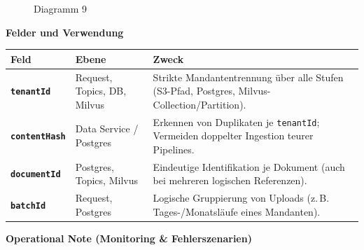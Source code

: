 \begin{figure}
\centering
\pandocbounded{}
\caption{Diagramm 9}
\end{figure}

\textbf{Felder und Verwendung}

{\def\LTcaptype{none} %
\begin{longtable}[]{@{}
  >{\raggedright\arraybackslash}p{}
  >{\raggedright\arraybackslash}p{}
  >{\raggedright\arraybackslash}p{}@{}}
\toprule\noalign{}
\begin{minipage}[b]{\linewidth}\raggedright
Feld
\end{minipage} & \begin{minipage}[b]{\linewidth}\raggedright
Ebene
\end{minipage} & \begin{minipage}[b]{\linewidth}\raggedright
Zweck
\end{minipage} \\
\midrule\noalign{}
\endhead
\bottomrule\noalign{}
\endlastfoot
\textbf{\texttt{tenantId}} & Request, Topics, DB, Milvus & Strikte
Mandantentrennung über alle Stufen (S3-Pfad, Postgres,
Milvus-Collection/Partition). \\
\textbf{\texttt{contentHash}} & Data Service / Postgres & Erkennen von
Duplikaten je \texttt{tenantId}; Vermeiden doppelter Ingestion teurer
Pipelines. \\
\textbf{\texttt{documentId}} & Postgres, Topics, Milvus & Eindeutige
Identifikation je Dokument (auch bei mehreren logischen Referenzen). \\
\textbf{\texttt{batchId}} & Request, Postgres & Logische Gruppierung von
Uploads (z.\,B. Tages-/Monatsläufe eines Mandanten). \\
\end{longtable}
}

\textbf{Operational Note (Monitoring \& Fehlerszenarien)}

